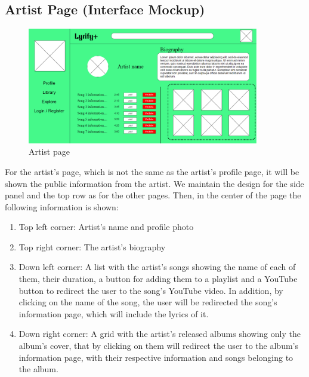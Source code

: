 \subsection{Artist Page (Interface Mockup)}

\begin{figure}[h!]
\centering
\includegraphics[width=0.9\textwidth]{sections/PLL/ArtistPageMockup.png}
\caption{Artist page}
\end{figure}

For the artist’s page, which is not the same as the artist’s profile page, it will be shown the public information from the artist. We maintain the design for the side panel and the top row as for the other pages. Then, in the center of the page the following information is shown:  

\begin{enumerate}
    \item Top left corner: Artist’s name and profile photo
    \item Top right corner: The artist’s biography
    \item Down left corner: A list with the artist’s songs showing the name of each of them, their duration, a button for adding them to a playlist and a YouTube button to redirect the user to the song’s YouTube video. In addition, by clicking on the name of the song, the user will be redirected the song’s information page, which will include the lyrics of it. 
    \item Down right corner: A grid with the artist’s released albums showing only the album’s cover, that by clicking on them will redirect the user to the album’s information page, with their respective information and songs belonging to the album.
\end{enumerate}
